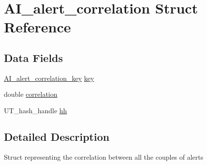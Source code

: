 \hypertarget{structAI__alert__correlation}{
\section{AI\_\-alert\_\-correlation Struct Reference}
\label{structAI__alert__correlation}
}
\subsection*{Data Fields}
\begin{DoxyCompactItemize}
\item 
\hyperlink{structAI__alert__correlation__key}{AI\_\-alert\_\-correlation\_\-key} \hyperlink{structAI__alert__correlation_a4e27da4922a1d44497634c8e5968d870}{key}
\item 
double \hyperlink{structAI__alert__correlation_aad417b2126ae26d7576f006a3dbcdc81}{correlation}
\item 
UT\_\-hash\_\-handle \hyperlink{structAI__alert__correlation_ad3020a87936a2193a92f09331401ad42}{hh}
\end{DoxyCompactItemize}


\subsection{Detailed Description}
Struct representing the correlation between all the couples of alerts 

